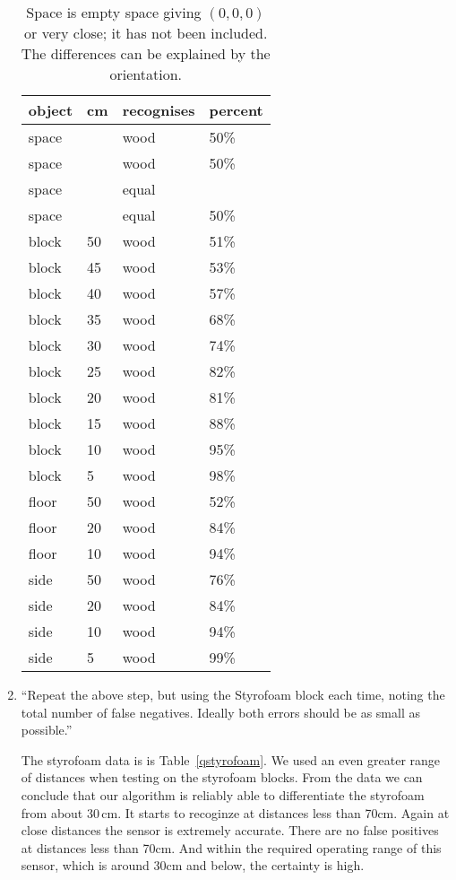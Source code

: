 \documentclass[twocolumn]{article}
\begin{document}
\begin{enumerate}
\begin{table}[htb]\footnotesize
\begin{center}\begin{tabular}{llll}
object& cm& recognises& percent \\
\hline
space&   & wood& 50\% \\
space&   & wood& 50\% \\
space&   & equal& \\
space&   & equal& 50\% \\
\hline
block& 50& wood& 51\% \\
block& 45& wood& 53\% \\
block& 40& wood& 57\% \\
block& 35& wood& 68\% \\
block& 30& wood& 74\% \\
block& 25& wood& 82\% \\
block& 20& wood& 81\% \\
block& 15& wood& 88\% \\
block& 10& wood& 95\% \\
block&  5& wood& 98\% \\
floor& 50& wood& 52\% \\
floor& 20& wood& 84\% \\
floor& 10& wood& 94\% \\
side& 50& wood& 76\% \\
side& 20& wood& 84\% \\
side& 10& wood& 94\% \\
side&  5& wood& 99\% \\
\end{tabular}\end{center}
\caption{Space is empty space giving $(0,0,0)$ or very close;
it has not been included. The differences can be explained by the orientation.}
\label{qwood}
\end{table}

\item
``Repeat the above step, but using the Styrofoam block each time, noting the total number of false negatives. Ideally both errors should be as small as possible.\cite{lab5}''

The styrofoam data is is Table~\ref{qstyrofoam}. We used an even greater range of distances when testing on the styrofoam blocks. From the data we can conclude that our algorithm is reliably able to differentiate the styrofoam from about 30\,cm. It starts to recoginze at distances less than 70cm. Again at close distances the sensor is extremely accurate. There are no false positives at distances less than 70cm. And within the required operating range of this sensor, which is around 30cm and below, the certainty is high. 


\end{enumerate}
\end{document}
